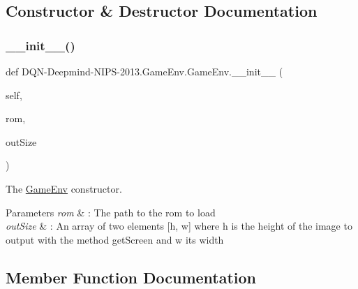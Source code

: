\subsection{Constructor \& Destructor Documentation}
\hypertarget{classDQN-Deepmind-NIPS-2013_1_1GameEnv_1_1GameEnv_a787af9d0e467c038e970246ae4dfdc08}{}\label{classDQN-Deepmind-NIPS-2013_1_1GameEnv_1_1GameEnv_a787af9d0e467c038e970246ae4dfdc08} 
\subsubsection{\texorpdfstring{\+\_\+\+\_\+init\+\_\+\+\_\+()}{\_\_init\_\_()}}
{\footnotesize\ttfamily def D\+QN-\/Deepmind-\/N\+I\+PS-\/2013.Game\+Env.\+Game\+Env.\+\_\+\+\_\+init\+\_\+\+\_\+ (\begin{DoxyParamCaption}\item[{}]{self,  }\item[{}]{rom,  }\item[{}]{out\+Size }\end{DoxyParamCaption})}



The \hyperlink{classDQN-Deepmind-NIPS-2013_1_1GameEnv_1_1GameEnv}{Game\+Env} constructor. 


\begin{DoxyParams}{Parameters}
{\em rom} & \+: The path to the rom to load \\
\hline
{\em out\+Size} & \+: An array of two elements \mbox{[}h, w\mbox{]} where h is the height of the image to output with the method get\+Screen and w its width \\
\hline
\end{DoxyParams}


\subsection{Member Function Documentation}
\hypertarget{classDQN-Deepmind-NIPS-2013_1_1GameEnv_1_1GameEnv_a675bec246ea3ed4506328deb5df64d4e}{}\label{classDQN-Deepmind-NIPS-2013_1_1GameEnv_1_1GameEnv_a675bec246ea3ed4506328deb5df64d4e} 
